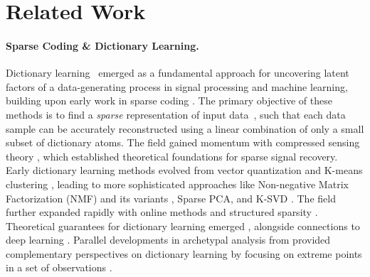 \section{Related Work}
\label{sec:related_work}
\paragraph{Sparse Coding \& Dictionary Learning.}
Dictionary learning~\cite{tovsic2011dictionary,rubinstein2010dictionaries,elad2010sparse,mairal2014sparse,dumitrescu2018dictionary} emerged as a fundamental approach for uncovering latent factors of a data-generating process in signal processing and machine learning, building upon early work in sparse coding \cite{olshausen1996emergence, olshausen1997sparse, lee2006efficient,foldiak2008sparse,rentzeperis2023beyond}.
The primary objective of these methods is to find a \emph{sparse} representation of input data~\cite{hurley2009comparing,eamaz2022building}, such that each data sample can be accurately reconstructed using a linear combination of only a small subset of dictionary atoms.
The field gained momentum with compressed sensing theory \cite{donoho2006compressed, candes2006robust, candes2008introduction, lopes2013estimating, rencker2019sparse}, which established theoretical foundations for sparse signal recovery. 
Early dictionary learning methods evolved from vector quantization and K-means clustering \cite{gersho1991vector, lloyd1982least}, leading to more sophisticated approaches like Non-negative Matrix Factorization (NMF) and its variants \cite{lee1999learning,lee2001algorithms,gillis2020nonnegative, ding2008convex,kersting2010hierarchical,thurau2009convex,gillis2015exact}, Sparse PCA, \cite{aspremont2004sparse,zou2006sparse} and K-SVD \cite{aharon2006rm,elad2006image}. 
The field further expanded rapidly \cite{wright2010sparse,chen2021low,tasissa2023kds} with online methods \cite{mairal2009online,kasiviswanathan2012online,lu2013online} and structured sparsity \cite{jenatton2010structured, bach2012structured,sun2014learning}. 
Theoretical guarantees for dictionary learning emerged \cite{aharon2006uniqueness,spielman2012exact,hillar2015can,fu2018identifiability,barbier2022statistical,hu2023global}, alongside connections to deep learning \cite{baccouche2012spatio, tariyal2016deep,papyan2017convolutional,mahdizadehaghdam2019deep,tamkin2023codebook,yu2023white}. 
Parallel developments in archetypal analysis from \citet{cutler1994archetypal} provided complementary perspectives on dictionary learning by focusing on extreme points in a set of observations \cite{dubins1962extreme}.\vspace{-5pt}


